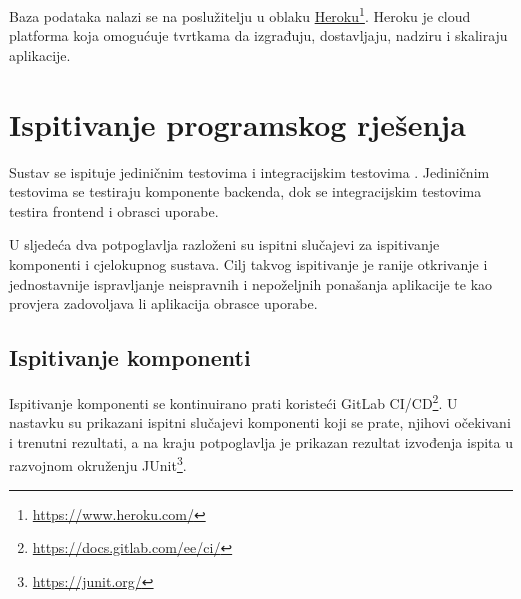 			Baza podataka nalazi se na poslužitelju u oblaku \underline{Heroku}\footnote{\url{https://www.heroku.com/}}. Heroku je cloud platforma koja omogućuje tvrtkama da izgrađuju, dostavljaju, nadziru i skaliraju aplikacije.
			
			\eject 

		
	
		\section{Ispitivanje programskog rješenja}
%			
			Sustav se ispituje jediničnim testovima  i integracijskim testovima . 
			Jediničnim testovima se testiraju komponente backenda, dok se integracijskim testovima testira frontend i obrasci uporabe.
			
			U sljedeća dva potpoglavlja razloženi su ispitni slučajevi za ispitivanje komponenti i cjelokupnog sustava.
			Cilj takvog ispitivanje je ranije otkrivanje i jednostavnije ispravljanje neispravnih i nepoželjnih ponašanja aplikacije te kao provjera zadovoljava li aplikacija obrasce uporabe.
	
			\clearpage
			\subsection{Ispitivanje komponenti}
			
			\indent Ispitivanje komponenti se kontinuirano prati koristeći GitLab CI/CD\footnote{\url{https://docs.gitlab.com/ee/ci/}}. 
			U nastavku su prikazani ispitni slučajevi komponenti koji se prate, njihovi očekivani i trenutni rezultati, a na kraju potpoglavlja je prikazan rezultat izvođenja ispita u razvojnom okruženju JUnit\footnote{\url{https://junit.org/}}.  \\
			
